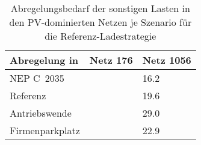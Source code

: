 {
\renewcommand{\arraystretch}{1.2}%
\begin{table}[H]
	\begin{center}
		\caption{Abregelungsbedarf der sonstigen Lasten in den PV-dominierten Netzen je Szenario für die Referenz-Ladestrategie}
		\begin{tabu} to 0.6\textwidth {X[1.5] X[1, r] X[1, r]}
			\toprule
			Abregelung in \si{\mwh} & Netz \num{176} & Netz \num{1056} \\ \midrule
			NEP C~\num{2035}                          &                & \num{16.2}      \\
			Referenz                                  &                & \num{19.6}      \\
			Antriebswende                             &                & \num{29.0}      \\
			\glqq Firmenparkplatz\grqq{}              &                & \num{22.9}      \\ \bottomrule
		\end{tabu}
		\label{tab:pv_dominated_week_a_load_cur}
	\end{center}
	\vspace{-3mm}%
\end{table}
}